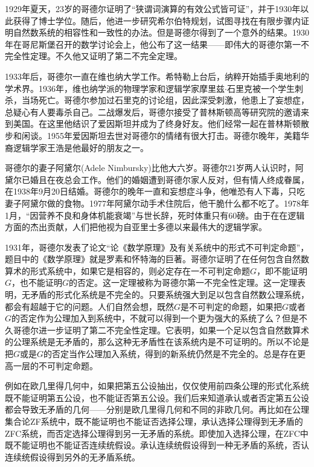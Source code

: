 \documentclass[b5paper]{ctexart}
\begin{document}
1929年夏天，23岁的哥德尔证明了“狭谓词演算的有效公式皆可证”，并于1930年以此获得了博士学位。随后，他进一步研究希尔伯特规划，试图寻找在有限步骤内证明自然数系统的相容性和一致性的办法。但是哥德尔得到了一个意外的结果。1930年在哥尼斯堡召开的数学讨论会上，他公布了这一结果——即伟大的哥德尔第一不完全性定理。不久他又证明了第二不完全定理。

1933年后，哥德尔一直在维也纳大学工作。希特勒上台后，纳粹开始插手奥地利的学术界。1936年，维也纳学派的物理学家和逻辑学家摩里兹$\cdot$石里克被一个学生刺杀，当场死亡。哥德尔参加过石里克的讨论组，因此深受刺激，他患上了妄想症，总疑心有人要毒杀自己。二战爆发后，哥德尔接受了普林斯顿高等研究院的邀请来到美国。在这里他结识了爱因斯坦并成为了终身好友。他们经常一起在普林斯顿散步和闲谈。1955年爱因斯坦去世对哥德尔的情绪有很大打击。哥德尔晚年，美籍华裔逻辑学家王浩是他最好的朋友之一。

哥德尔的妻子阿黛尔(Adele Nimbursky)比他大六岁。哥德尔21岁两人认识时，阿黛尔已婚且在夜总会工作。他们的婚姻遭到哥德尔家人反对，但有情人终成眷属，在1938年9月20日结婚。哥德尔的晚年一直和妄想症斗争，他唯恐有人下毒，只吃妻子阿黛尔做的食物。1977年阿黛尔动手术住院后，他干脆什么都不吃了。1978年1月，“因营养不良和身体机能衰竭”与世长辞，死时体重只有60磅。由于在在逻辑方面的杰出贡献，人们把他视为自亚里士多德以来最伟大的逻辑学家。

1931年，哥德尔发表了论文“论《数学原理》及有关系统中的形式不可判定命题”，题目中的《数学原理》就是罗素和怀特海的巨著。哥德尔证明了在任何包含自然数算术的形式系统中，如果它是相容的，则必定存在一不可判定命题$G$，即不能证明$G$，也不能证明$G$的否定。这一定理被称为哥德尔第一不完全性定理。这一定理表明，无矛盾的形式化系统是不完全的。只要系统强大到足以包含自然数公理系统，都会有超越于它的问题。人们自然会想，既然$G$是不可判定的命题，如果把$G$或者$G$的否定作为公理加入到系统中，不就可以得到一个更为强大的系统了么？但是不久哥德尔进一步证明了第二不完全性定理。它表明，如果一个足以包含自然数算术的公理系统是无矛盾的，那么这种无矛盾性在该系统内是不可证明的。所以不论是把$G$或是$G$的否定当作公理加入系统，得到的新系统仍然是不完全的。总是存在更高一层的不可判定命题。

例如在欧几里得几何中，如果把第五公设抽出，仅仅使用前四条公理的形式化系统既不能证明第五公设，也不能证否第五公设。我们后来知道承认或者否定第五公设都会导致无矛盾的几何——分别是欧几里得几何和不同的非欧几何。再比如在公理集合论ZF系统中，既不能证明也不能证否选择公理，承认选择公理得到无矛盾的ZFC系统，而否定选择公理得到另一无矛盾的系统。即使加入选择公理，在ZFC中既不能证明也不能证否连续统假设。承认连续统假设得到一种无矛盾的系统，否认连续统假设得到另外的无矛盾系统。
\end{document}
